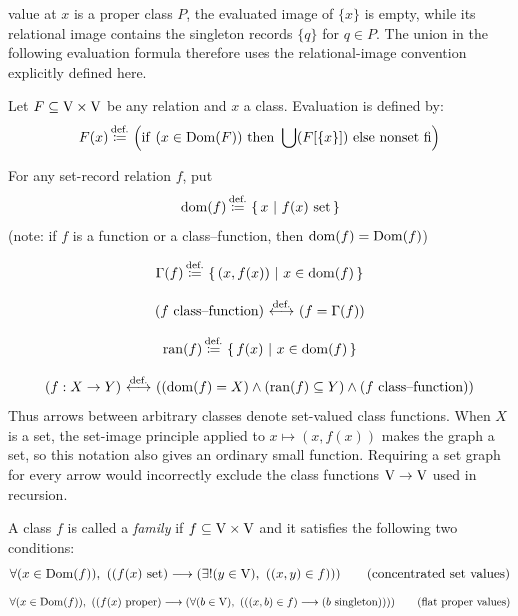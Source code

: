 value at $x$ is a proper class $P$, the evaluated image of $\{x\}$ is
empty, while its relational image contains the singleton records
$\{q\}$ for $q\in P$. The union in the following evaluation formula
therefore uses the relational-image convention explicitly defined here.
\begin{definition}
Let $F\subseteq\mathrm{V}\times\mathrm{V}$ be any relation and $x$ a class.
Evaluation is defined by:
\[
F(x) \,{\stackrel{{\textrm{def.}}}{\coloneqq}}\, \left(\mathrm{if}\ (x\in\mathrm{Dom}(F))\ \mathrm{then}\ \bigcup(F[\{x\}])\ \mathrm{else} \ \text{nonset}\ \mathrm{fi}\right)
\]
\end{definition}

\begin{definition}
For any set-record relation $f$, put
\[
\mathrm{dom}(f) \,{\stackrel{{\textrm{def.}}}{\coloneqq}}\, \left\{\,x\ \middle|\ f(x)\mathrm{\ set}\,\right\}
\]
(note: if $f$ is a function or a class--function, then $\mathrm{dom}(f)=\mathrm{Dom}(f)$)
\end{definition}
\begin{definition}
\[
\Gamma(f)\,{\stackrel{{\textrm{def.}}}{\coloneqq}}\,\left\{\,(x,f(x))\ \middle|\ x\in\mathrm{dom}(f)\,\right\}
\]
\end{definition}
\begin{definition}
\[
(f\text{ class--function})\ {\stackrel{{\textrm{def.}}}{\longleftrightarrow}}\  (f=\Gamma(f))
\]
\end{definition}
\begin{definition}[range]
\[
\mathrm{ran}(f) \,{\stackrel{{\textrm{def.}}}{\coloneqq}}\, \left\{\,f(x)\ \middle|\ x\in\mathrm{dom}(f)\,\right\}
\]
\end{definition}
\begin{definition}
\[
(f:X\to Y) \ {\stackrel{{\textrm{def.}}}{\longleftrightarrow}}\  ((\mathrm{dom}(f)=X)\land(\mathrm{ran}(f)\subseteq Y)\land(f\text{ class--function}))
\]
Thus arrows between arbitrary classes denote set-valued class functions.
When $X$ is a set, the set-image principle applied to
$x\mapsto(x,f(x))$ makes the graph a set, so this notation also gives an
ordinary small function. Requiring a set graph for every arrow would
incorrectly exclude the class functions $\mathrm{V}\to\mathrm{V}$ used in recursion.
\end{definition}
\begin{definition}[family]
A class $f$ is called a \textit{family} if $f\subseteq\mathrm{V}\times\mathrm{V}$ and
it satisfies the following two conditions:
\[
\forall (x\in\Dom(f)),\ %
(
(
f(x)
\text{ set}
)
\implies
(
\exists! (y\in\V),\ %
((x,y)\in f)
)
)
\tag{concentrated set values}
\]
\[
\forall (x\in\Dom(f)),\ %
(
(
f(x)
\text{ proper}
)
\implies
(
\forall (b\in\V),\ %
(
((x,b)\in f)
\implies
(b\text{ singleton})
)
)
)
\tag{flat proper values}
\]
\end{definition}
